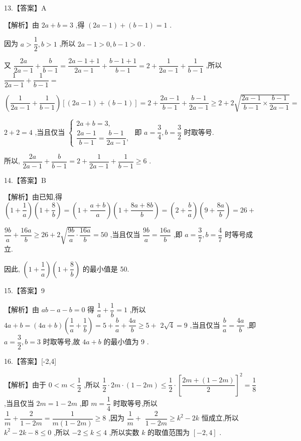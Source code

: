 \documentclass[10pt]{article}
\begin{document}
13.【答案】A

【解析】由 ${2a} + b = 3$ ,得 $\left( {{2a} - 1}\right)  + \left( {b - 1}\right)  = 1$ .

因为 $a > \dfrac{1}{2},b > 1$ ,所以 ${2a} - 1 > 0,b - 1 > 0$ .

又 $\dfrac{2a}{{2a} - 1} + \dfrac{b}{b - 1} = \dfrac{{2a} - 1 + 1}{{2a} - 1} + \dfrac{b - 1 + 1}{b - 1} = 2 + \dfrac{1}{{2a} - 1} + \dfrac{1}{b - 1}$ ,所以 $\dfrac{1}{{2a} - 1} + \dfrac{1}{b - 1} =$

$\left( {\dfrac{1}{{2a} - 1} + \dfrac{1}{b - 1}}\right) \left\lbrack  {\left( {{2a} - 1}\right)  + \left( {b - 1}\right) }\right\rbrack   = 2 + \dfrac{{2a} - 1}{b - 1} + \dfrac{b - 1}{{2a} - 1} \geq  2 + 2\sqrt{\dfrac{{2a} - 1}{b - 1} \times  \dfrac{b - 1}{{2a} - 1}} =$

$2 + 2 = 4$ ,当且仅当 $\left\{  \begin{array}{l} {2a} + b = 3, \\  \dfrac{{2a} - 1}{b - 1} = \dfrac{b - 1}{{2a} - 1}, \end{array}\right.$ 即 $a = \dfrac{3}{4},b = \dfrac{3}{2}$ 时取等号.

所以, $\dfrac{2a}{{2a} - 1} + \dfrac{b}{b - 1} = 2 + \dfrac{1}{{2a} - 1} + \dfrac{1}{b - 1} \geq  6$ .

14.【答案】B

【解析】由已知,得 $\left( {1 + \dfrac{1}{a}}\right) \left( {1 + \dfrac{8}{b}}\right)  = \left( {1 + \dfrac{a + b}{a}}\right) \left( {1 + \dfrac{{8a} + {8b}}{b}}\right)  = \left( {2 + \dfrac{b}{a}}\right) \left( {9 + \dfrac{8a}{b}}\right)  = {26} +$

$\dfrac{9b}{a} + \dfrac{16a}{b} \geq  {26} + 2\sqrt{\dfrac{9b}{a} \cdot  \dfrac{16a}{b}} = {50}$ ,当且仅当 $\dfrac{9b}{a} = \dfrac{16a}{b}$ ,即 $a = \dfrac{3}{7},b = \dfrac{4}{7}$ 时等号成立.

因此, $\left( {1 + \dfrac{1}{a}}\right) \left( {1 + \dfrac{8}{b}}\right)$ 的最小值是 50.

15.【答案】9

【解析】由 ${ab} - a - b = 0$ 得 $\dfrac{1}{a} + \dfrac{1}{b} = 1$ ,所以 ${4a} + b = \left( {{4a} + b}\right) \left( {\dfrac{1}{a} + \dfrac{1}{b}}\right)  = 5 + \dfrac{b}{a} + \dfrac{4a}{b} \geq  5 +$  $2\sqrt{4} = 9$ ,当且仅当 $\dfrac{b}{a} = \dfrac{4a}{b}$ ,即 $a = \dfrac{3}{2},b = 3$ 时取等号,故 ${4a} + b$ 的最小值为 9 .

16.【答案】[-2,4]

【解析】由于 $0 < m < \dfrac{1}{2}$ ,所以 $\dfrac{1}{2} \cdot  {2m} \cdot  \left( {1 - {2m}}\right)  \leq  \dfrac{1}{2} \cdot  {\left\lbrack  \dfrac{{2m} + \left( {1 - {2m}}\right) }{2}\right\rbrack  }^{2} = \dfrac{1}{8}$ ,当且仅当 ${2m} = 1 - {2m}$ ,即 $m = \dfrac{1}{4}$ 时取等号,所以 $\dfrac{1}{m} + \dfrac{2}{1 - {2m}} = \dfrac{1}{m\left( {1 - {2m}}\right) } \geq  8$ ,因为 $\dfrac{1}{m} +$  $\dfrac{2}{1 - {2m}} \geq  {k}^{2} - {2k}$ 恒成立,所以 ${k}^{2} - {2k} - 8 \leq  0$ ,所以 $- 2 \leq  k \leq  4$ ,所以实数 $k$ 的取值范围为 $\left\lbrack  {-2,4}\right\rbrack$ .
\end{document}
